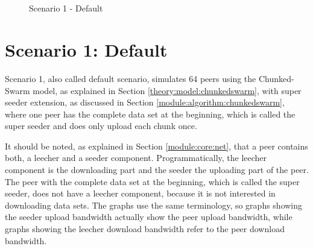 \begin{figure}[!ht]
	\begin{center}	
		~ %

	 	~ %

		\caption{Scenario 1 - Default}
		\label{fig:s1}
	\end{center}
\end{figure}


\section{Scenario 1: Default}
\label{evaluation:1}

Scenario 1, also called default scenario, simulates 64 peers using the Chunked-Swarm model, as explained in Section \ref{theory:model:chunkedswarm}, with super seeder extension, as discussed in Section \ref{module:algorithm:chunkedswarm}, where one peer has the complete data set at the beginning, which is called the super seeder and does only upload each chunk once. 

It should be noted, as explained in Section \ref{module:core:net}, that a peer contains both, a leecher and a seeder component. Programmatically, the leecher component is the downloading part and the seeder the uploading part of the peer. The peer with the complete data set at the beginning, which is called the super seeder, does not have a leecher component, because it is not interested in downloading data sets. The graphs use the same terminology, so graphs showing the seeder upload bandwidth actually show the peer upload bandwidth, while graphs showing the leecher download bandwidth refer to the peer download bandwidth.

